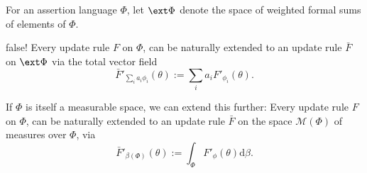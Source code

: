 
\begin{defn}
For an assertion language $\Phi$, let $\ext\Phi$ denote
the space of weighted formal sums of elements of $\Phi$.
\end{defn}

\begin{prop}{\color{red} false!}
Every  update rule $F$ on $\Phi$, can be naturally extended to an update rule
$\bar F$ on $\ext\Phi$
via the total vector field
\[
    \bar F'_{\textstyle\sum_i a_i \phi_i} ( \theta ) := \sum_{i} a_i F'_{\phi_i}(\theta).
\]
%
\end{prop}

If $\Phi$ is itself a measurable space, we can extend this further:
Every  update rule $F$ on $\Phi$, can be naturally extended to an update rule $\bar F$ on the space $\mathcal M(\Phi)$ of measures over $\Phi$, via
\[
\bar F'_{\beta(\Phi)}( \theta ) := \int_{\Phi} F'_\phi(\theta) \mathrm d\beta.
\]
